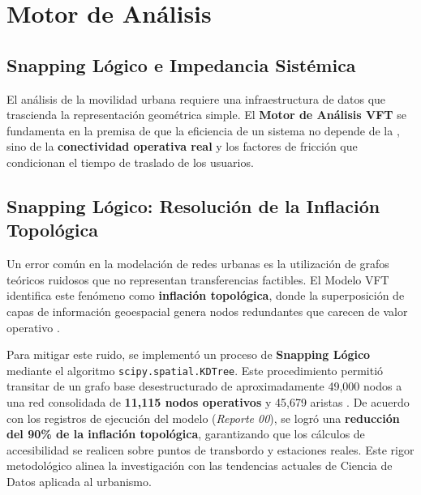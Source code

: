 
\section{Motor de Análisis}

\subsection{Snapping Lógico e Impedancia Sistémica}
\label{subsubsec:motor-analisis}

El análisis de la movilidad urbana requiere una infraestructura de datos que trascienda 
la representación geométrica simple. El \textbf{Motor de Análisis VFT} se fundamenta 
en la premisa de que la eficiencia de un sistema no depende de la 
, sino de la \textbf{conectividad operativa real} 
y los factores de fricción que condicionan el tiempo de traslado de los usuarios.

\subsection{Snapping Lógico: Resolución de la Inflación Topológica}

Un error común en la modelación de redes urbanas es la utilización de grafos teóricos 
ruidosos que no representan transferencias factibles. El Modelo VFT identifica este 
fenómeno como \textbf{inflación topológica}, donde la superposición de capas de información 
geoespacial genera nodos redundantes que carecen de valor operativo 
\cite{Garibaldi2024VFT, IMCO2019Doc}.

Para mitigar este ruido, se implementó un proceso de \textbf{Snapping Lógico} mediante el 
algoritmo \texttt{scipy.spatial.KDTree}. Este procedimiento permitió transitar de un grafo 
base desestructurado de aproximadamente 49,000 nodos a una red consolidada de 
\textbf{11,115 nodos operativos} y 45,679 aristas \cite{mainPGaribaldi2024VFTDF}. 
De acuerdo con los registros de ejecución del modelo (\textit{Reporte 00}), 
se logró una \textbf{reducción del 90\% de la inflación topológica}, garantizando que los 
cálculos de accesibilidad se realicen sobre puntos de transbordo y estaciones reales. 
Este rigor metodológico alinea la investigación con las tendencias actuales de Ciencia 
de Datos aplicada al urbanismo.

